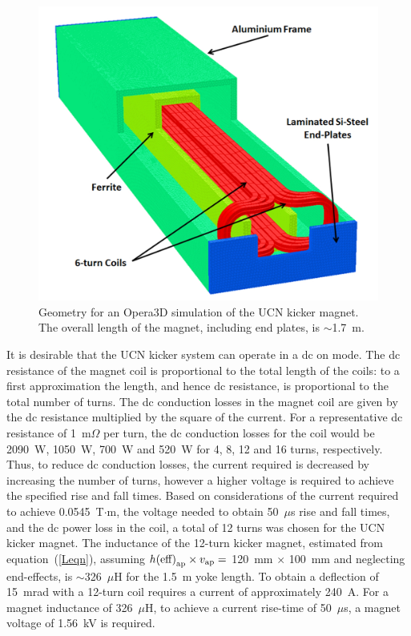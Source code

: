 \documentclass[aps,prab,twocolumn,superscriptaddress]{revtex4-1}
\begin{document}
\begin{figure}[t]
	\includegraphics[width=\linewidth]{UCN_magnet.jpg}
	\caption{Geometry for an Opera3D simulation of the UCN kicker magnet.  The overall length of the magnet, including end plates, is $\sim$1.7~m.}
	\label{fig:UCN-magnet}
\end{figure}
It is desirable that the UCN kicker system can operate in a dc on mode. The dc resistance of the magnet coil is proportional to the total length of the coils: to a first approximation the length, and hence dc resistance, is proportional to the total number of turns. The dc conduction losses in the magnet coil are given by the dc resistance multiplied by the square of the current. For a representative dc resistance of 1~m$\Omega$ per turn, the dc conduction losses for the coil would be 2090~W, 1050~W, 700~W and 520~W for 4, 8, 12 and 16 turns, respectively. Thus, to reduce dc conduction losses, the current required is decreased by increasing the number of turns, however a higher voltage is required to achieve the specified rise and fall times. Based on considerations of the current required  to achieve 0.0545~T$\cdot$m, the voltage needed to obtain 50~$\mu$s rise and fall times, and the dc power loss in the coil, a total of 12 turns was chosen for the UCN kicker magnet. The inductance of the 12-turn kicker magnet, estimated from equation~(\ref{Leqn}), assuming $h{\rm(eff)}_{\rm{ap}} \times v_{\rm{ap}} = $ 120~mm $\times$ 100~mm and neglecting end-effects, is $\sim$326~$\mu$H for the 1.5~m yoke length. 
To obtain a deflection of 15~mrad with a 12-turn coil requires a current of approximately 240~A. For a magnet inductance of 326~$\mu$H, to achieve a current rise-time of 50~$\mu$s, a magnet voltage of 1.56~kV is required.
\end{document}
